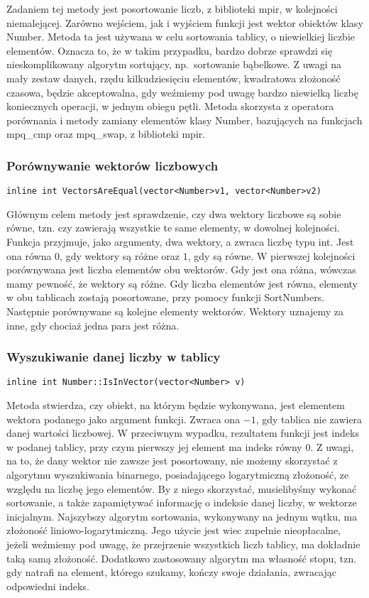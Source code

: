 Zadaniem tej metody jest posortowanie liczb, z biblioteki mpir, w kolejności niemalejącej. Zarówno wejściem, jak i wyjściem funkcji jest wektor obiektów klasy Number. Metoda ta jest używana w celu sortowania tablicy, o niewielkiej liczbie elementów. Oznacza to, że w takim przypadku, bardzo dobrze sprawdzi się nieskomplikowany algorytm sortujący, np.\ sortowanie bąbelkowe. Z uwagi na mały zestaw danych, rzędu kilkudziesięciu elementów, kwadratowa złożoność czasowa, będzie akceptowalna, gdy weźmiemy pod uwagę bardzo niewielką liczbę koniecznych operacji, w jednym obiegu pętli. Metoda skorzysta z operatora porównania i metody zamiany elementów klasy Number, bazujących na funkcjach mpq\_cmp oraz mpq\_swap, z biblioteki mpir.

\subsubsection{Porównywanie wektorów liczbowych}
\begin{lstlisting}
inline int VectorsAreEqual(vector<Number>v1, vector<Number>v2)
\end{lstlisting}

Głównym celem metody jest sprawdzenie, czy dwa wektory liczbowe są sobie równe, tzn. czy zawierają wszystkie te same elementy, w dowolnej kolejności. Funkcja przyjmuje, jako argumenty, dwa wektory, a zwraca liczbę typu int. Jest ona równa $0$, gdy wektory są różne oraz $1$, gdy są równe. W pierwszej kolejności porównywana jest liczba elementów obu wektorów. Gdy jest ona różna, wówczas mamy pewność, że wektory są różne. Gdy liczba elementów jest równa, elementy w obu tablicach zostają posortowane, przy pomocy funkcji SortNumbers. Następnie porównywane są kolejne elementy wektorów. Wektory uznajemy za inne, gdy chociaż jedna para jest różna.

\subsubsection{Wyszukiwanie danej liczby w tablicy}
\begin{lstlisting}
inline int Number::IsInVector(vector<Number> v)
\end{lstlisting}

Metoda stwierdza, czy obiekt, na którym będzie wykonywana, jest elementem wektora podanego jako argument funkcji. Zwraca ona $-1$, gdy tablica nie zawiera danej wartości liczbowej. W przeciwnym wypadku, rezultatem funkcji jest indeks w podanej tablicy, przy czym pierwszy jej element ma indeks równy $0$. Z uwagi, na to, że dany wektor nie zawsze jest posortowany, nie możemy skorzystać z algorytmu wyszukiwania binarnego, posiadającego logarytmiczną złożoność, ze względu na liczbę jego elementów. By z niego skorzystać, musielibyśmy wykonać sortowanie, a także zapamiętywać informację o indeksie danej liczby, w wektorze inicjalnym. Najszybszy algorytm sortowania, wykonywany na jednym wątku, ma złożoność liniowo-logarytmiczną. Jego użycie jest wiec zupełnie nieopłacalne, jeżeli weźmiemy pod uwagę, że przejrzenie wszystkich liczb tablicy, ma dokładnie taką samą złożoność. Dodatkowo zastosowany algorytm ma własność stopu, tzn. gdy natrafi na element, którego szukamy, kończy swoje działania, zwracając odpowiedni indeks.

